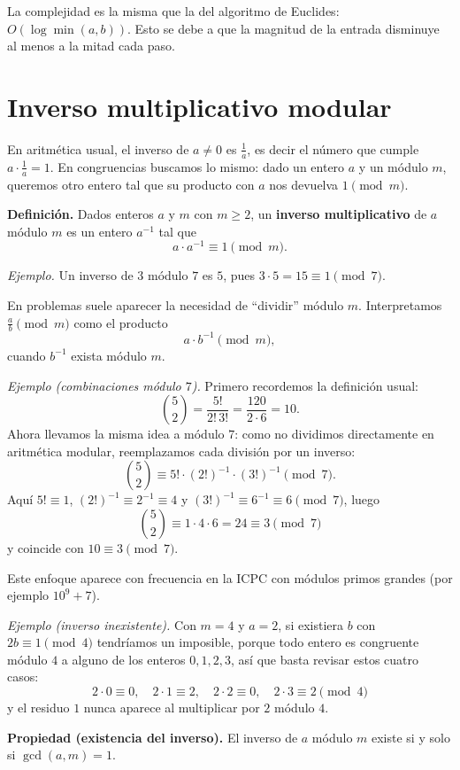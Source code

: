La complejidad es la misma que la del algoritmo de Euclides: $O(\log \min(a,b))$. Esto se debe a que la magnitud de la entrada disminuye al menos a la mitad cada paso.

\section{Inverso multiplicativo modular}

En aritmética usual, el inverso de $a \neq 0$ es $\frac{1}{a}$, es decir el número que cumple $a \cdot \frac{1}{a} = 1$. En congruencias buscamos lo mismo: dado un entero $a$ y un módulo $m$, queremos otro entero tal que su producto con $a$ nos devuelva $1 \pmod{m}$.

\textbf{Definición.} Dados enteros $a$ y $m$ con $m \ge 2$, un \textbf{inverso multiplicativo} de $a$ módulo $m$ es un entero $a^{-1}$ tal que
\[
a \cdot a^{-1} \equiv 1 \pmod{m}.
\]

\textit{Ejemplo.} Un inverso de $3$ módulo $7$ es $5$, pues $3 \cdot 5 = 15 \equiv 1 \pmod{7}$.

En problemas suele aparecer la necesidad de ``dividir'' módulo $m$. Interpretamos $\frac{a}{b} \pmod{m}$ como el producto
\[
a \cdot b^{-1} \pmod{m},
\]
cuando $b^{-1}$ exista módulo $m$.

\textit{Ejemplo (combinaciones módulo $7$).} Primero recordemos la definición usual:
\[
\binom{5}{2} = \frac{5!}{2!\,3!} = \frac{120}{2\cdot 6} = 10.
\]
Ahora llevamos la misma idea a módulo $7$: como no dividimos directamente en aritmética modular, reemplazamos cada división por un inverso:
\[
\binom{5}{2} \equiv 5! \cdot (2!)^{-1} \cdot (3!)^{-1} \pmod{7}.
\]
Aquí $5! \equiv 1$, $(2!)^{-1} \equiv 2^{-1} \equiv 4$ y $(3!)^{-1} \equiv 6^{-1} \equiv 6 \pmod{7}$, luego
\[
\binom{5}{2} \equiv 1\cdot 4\cdot 6 = 24 \equiv 3 \pmod{7}
\]
y coincide con $10 \equiv 3 \pmod{7}$.

Este enfoque aparece con frecuencia en la ICPC con módulos primos grandes (por ejemplo $10^9+7$).

\textit{Ejemplo (inverso inexistente).} Con $m = 4$ y $a = 2$, si existiera $b$ con $2b \equiv 1 \pmod{4}$ tendríamos un imposible, porque todo entero es congruente módulo $4$ a alguno de los enteros $0,1,2,3$, así que basta revisar estos cuatro casos:
\[
2 \cdot 0 \equiv 0,\quad
2 \cdot 1 \equiv 2,\quad
2 \cdot 2 \equiv 0,\quad
2 \cdot 3 \equiv 2 \pmod{4}
\]
y el residuo $1$ nunca aparece al multiplicar por $2$ módulo $4$.

\textbf{Propiedad (existencia del inverso).} El inverso de $a$ módulo $m$ existe si y solo si $\gcd(a, m) = 1$.

